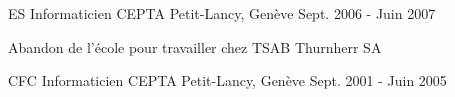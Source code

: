 
\begin{cventries}

  \cventry
    {ES Informaticien} %
    {CEPTA} %
    {Petit-Lancy, Genève} %
    {Sept. 2006 - Juin 2007} %
    {
      	\begin{cvitems} %
		\item{Abandon de l'école pour travailler chez TSAB Thurnherr SA}
    	\end{cvitems}
    }


\end{cventries}
\begin{cventries}

  \cventry
    {CFC Informaticien} %
    {CEPTA} %
    {Petit-Lancy, Genève} %
    {Sept. 2001 - Juin 2005} %
    {
      	\begin{cvitems} %
    	\end{cvitems}
    }


\end{cventries}
